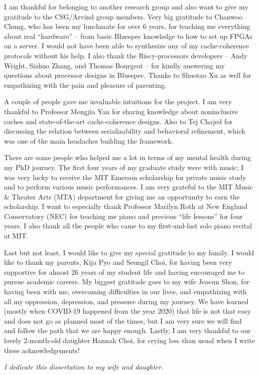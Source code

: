 I am thankful for belonging to another research group and also want to give my gratitude to the CSG/Arvind group members.
Very big gratitude to Chanwoo Chung, who has been my lunchmate for over 6 years, for teaching me everything about real ``hardware'' -- from basic Bluespec knowledge to how to set up FPGAs on a server.
I would not have been able to synthesize any of my \hemiola{} cache-coherence protocols without his help.
I also thank the Riscy-processors developers -- Andy Wright, Sizhuo Zhang, and Thomas Bourgeat -- for kindly answering my questions about processor designs in Bluespec.
Thanks to Shuotao Xu as well for empathizing with the pain and pleasure of parenting.

A couple of people gave me invaluable intuitions for the \hemiola{} project.
I am very thankful to Professor Mengjia Yan for sharing knowledge about noninclusive caches and state-of-the-art cache-coherence designs.
Also to Tej Chajed for discussing the relation between serializability and behavioral refinement, which was one of the main headaches building the framework.

There are some people who helped me a lot in terms of my mental health during my PhD journey.
The first four years of my graduate study were with music; I was very lucky to receive the MIT Emerson scholarship for private music study and to perform various music performances.
I am very grateful to the MIT Music \& Theater Arts (MTA) department for giving me an opportunity to earn the scholarship.
I want to especially thank Professor Marilyn Roth at New England Conservatory (NEC) for teaching me piano and precious ``life lessons'' for four years.
I also thank all the people who came to my first-and-last solo piano recital at MIT.

Last but not least, I would like to give my special gratitude to my family.
I would like to thank my parents, Kija Pyo and Seungil Choi, for having been very supportive for almost 26 years of my student life and having encouraged me to pursue academic careers.
My biggest gratitude goes to my wife Jeaeun Shon, for having been with me, overcoming difficulties in our lives, and empathizing with all my oppression, depression, and pressure during my journey.
We have learned (mostly when COVID-19 happened from the year 2020) that life is not that easy and does not go as planned most of the times, but I am very sure we will find and follow the path that we are happy enough.
Lastly, I am very thankful to our lovely 2-month-old daughter Hannah Choi, for crying less than usual when I write these acknowledgements!

\emph{I dedicate this dissertation to my wife and daughter.}
